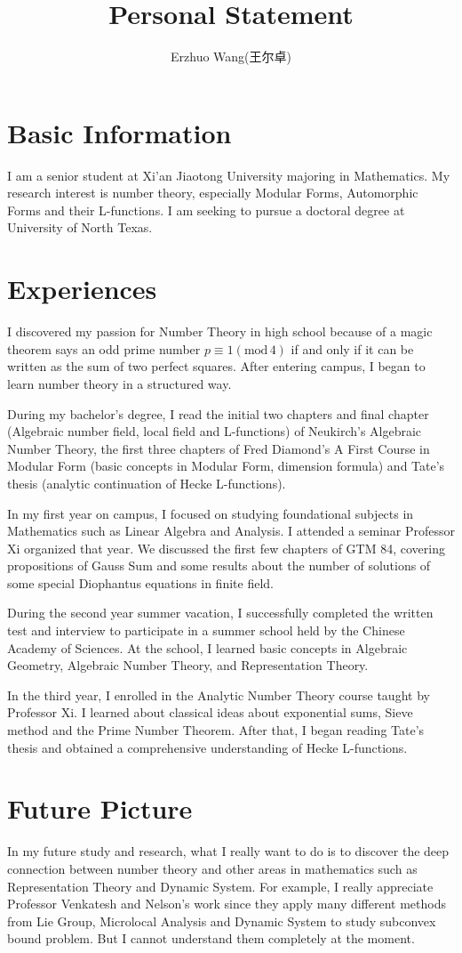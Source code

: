 \documentclass[12pt]{article}
\title{Personal Statement}
\author{Erzhuo Wang(王尔卓)}
\date{}
\renewcommand{\mod}[1]{(\text{mod}\,#1)}
\theoremstyle{definition}
\begin{document}
\maketitle 
\section{Basic Information}
I am a senior student at Xi'an Jiaotong University majoring in Mathematics. 
My research interest is number theory, especially Modular Forms, Automorphic Forms and their L-functions. 
I am seeking to pursue a doctoral degree at University of North Texas.
\section{Experiences}
I discovered my passion for Number Theory in high school because of a magic theorem says an odd prime number 
$p \equiv 1\mod{4}$ if and only if it can be written as the sum of two perfect squares. 
After entering campus, I began to learn number theory in a structured way.

During my bachelor's degree,
I read the initial two chapters and final chapter (Algebraic number field, local field and L-functions) of Neukirch's Algebraic Number Theory, 
the first three chapters of Fred Diamond's A First Course in Modular Form (basic concepts in Modular Form, dimension formula)
and Tate's thesis (analytic continuation of Hecke L-functions).  

In my first year on campus, I focused on studying foundational subjects in Mathematics such as Linear Algebra and Analysis.
I attended a seminar Professor Xi organized that year. 
We discussed the first few chapters of GTM 84, covering propositions of Gauss Sum and some results about the number of 
solutions of some special
Diophantus equations in finite field. 

During the second year summer vacation, 
I successfully completed the written test and interview to participate in a summer school held by the Chinese Academy of Sciences. 
At the school, I learned basic concepts in Algebraic Geometry, Algebraic Number Theory, and Representation Theory. 

In the third year, I enrolled in the Analytic Number Theory course taught by Professor Xi. 
I learned about classical ideas about exponential sums, Sieve method and the Prime Number Theorem. 
After that, I began reading Tate's thesis and obtained a comprehensive understanding of Hecke L-functions. 
\section{Future Picture}
In my future study and research, what I really want to do is to 
discover the deep connection between number theory and other areas in mathematics such as Representation Theory 
and Dynamic System. 
For example, I really appreciate Professor Venkatesh and Nelson's work since they apply many different 
methods from Lie Group, Microlocal Analysis and Dynamic System to study subconvex bound problem. 
But I cannot understand them completely at the moment. 
\end{document}
